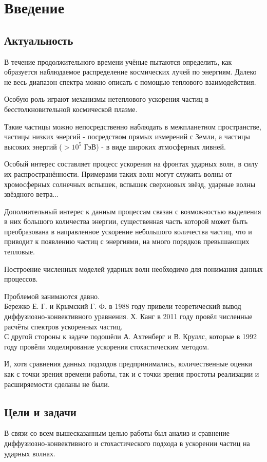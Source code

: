 \documentclass[a4paper,14pt]{extarticle} %
\begin{document}
\section{Введение}
\subsection{Актуальность}
В течение продолжительного времени учёные пытаются определить, как образуется наблюдаемое распределение космических лучей по энергиям. Далеко не весь диапазон спектра можно описать с помощью теплового взаимодействия.

Особую роль играют механизмы нетеплового ускорения частиц в бесстолкновительной космической плазме. 

Такие частицы можно непосредственно наблюдать в межпланетном пространстве, частицы низких энергий - посредством прямых измерений  с Земли, а частицы высоких энергий ($>10^5$ ГэВ) - в виде широких атмосферных ливней.

Особый интерес составляет процесс ускорения на фронтах ударных волн, в силу их распространённости.
Примерами таких волн могут служить волны от хромосферных солнечных вспышек, вспышек сверхновых звёзд, ударные волны звёздного ветра...

Дополнительный интерес к данным процессам связан с возможностью выделения в них большого количества энергии, существенная часть которой может быть преобразована в направленное ускорение небольшого количества частиц, что и приводит к появлению частиц с энергиями, на много порядков превышающих тепловые.

Построение численных моделей ударных волн необходимо для понимания данных процессов.

Проблемой занимаются давно.\\
 Бережко Е. Г. и Крымский Г. Ф. в 1988 году привели теоретический вывод диффузиозно-конвективного уравнения. Х. Канг в 2011 году провёл численные расчёты спектров ускоренных частиц. \\ 
С другой стороны к задаче подошёли А. Ахтенберг и В. Круллс, которые в 1992 году провёли моделирование ускорения стохастическим методом.

И, хотя сравнения данных подходов предпринимались, количественные оценки как с точки зрения времени работы, так и с точки зрения простоты реализации и расширяемости сделаны не были.

\subsection{Цели и задачи}
В связи со всем вышесказанным целью работы был анализ и сравнение \\
диффузиозно-конвективного и стохастического подхода в ускорении частиц на ударных волнах.
\end{document}
